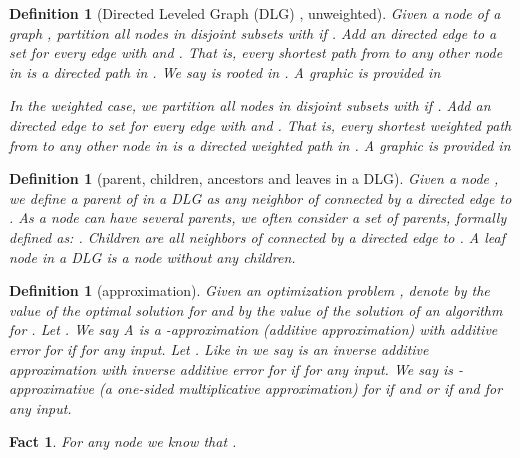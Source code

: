 \documentclass[11pt]{article}
\newtheorem{definition}[theorem]{Definition}
\newtheorem{fact}[theorem]{Fact}
\newif\iffull
\newif\ifshort
\begin{document}
\begin{definition}[Directed Leveled Graph (DLG) , unweighted]
 Given a node  of a graph , partition all nodes  in disjoint subsets  with  if . Add an directed edge  to a set  for every edge  with  and .
That is, every shortest path from  to any other node  in  is a directed path in . We say  is rooted in .
A graphic is provided in 
\ifshort
Appendix \ref{FULL:sec:model}, Figure \ref{FULL:abb:leveledgraph}.
\fi
\iffull
Figure \ref{abb:leveledgraph}.
\fi

In the weighted case, we partition all nodes  in disjoint subsets  with  if . Add an directed edge  to set  for every edge  with  and .
That is, every shortest weighted path from  to any other node  in  is a directed weighted path in . 
A graphic is provided in 
\ifshort
Appendix \ref{FULL:sec:model}, Figure \ref{FULL:abb:leveledgraphweighted}.
\fi
\iffull
Figure \ref{abb:leveledgraphweighted}.
\fi

\end{definition}
\iffull
\begin{figure}[htb]
\begin{center}
\texttt{[image: graphLs\_sets]}
\caption{ on the left side and its leveled graph  rooted in  on the right.}\label{abb:leveledgraph}
\end{center}
\end{figure}
\begin{figure}[htb]
\begin{center}
\texttt{[image: graph\_weighted\_Ls-sets]}
\caption{ on the left side and its leveled graph  rooted in  on the right}\label{abb:leveledgraphweighted}
\end{center}
\end{figure}
\fi

\begin{definition}[parent, children, ancestors and leaves  in a DLG]
 Given a node , we define a parent of  in  a DLG  as any neighbor  of  connected by a directed edge  to . As a node can have several parents, we often consider a set of parents, formally defined as: . Children are all neighbors  of  connected by a directed edge  to . A leaf node in a DLG  is a node without any children.
\end{definition}


\begin{definition}[approximation] 
Given an optimization problem , denote by  the value of the optimal solution for  and by  the value of the solution of an algorithm  for .
Let . We say A is a -approximation (additive approximation) with additive error  for  if  for any input.
Let . Like in \cite{eppstein:2001:fastCCapprox} we say  is an inverse additive approximation with inverse additive error  for  if  for any input. 
We say  is -approximative (a one-sided multiplicative approximation) for  if  and  or if  and  for any input.
\end{definition}
\iffull
Like in \cite{eppstein:2001:fastCCapprox}, the inverse additive error is used in the closeness centrality approximation, see Section \ref{sec:CC}.
\fi
\begin{fact}\label{fact:ecc-approx-diam}
 For any node  we know that .\end{fact}
\end{document}

